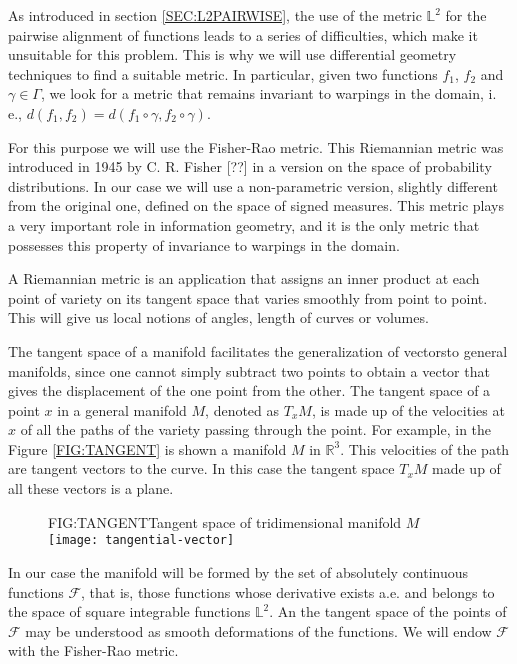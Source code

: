 As introduced in section \ref{SEC:L2PAIRWISE}, the use of the metric $\mathbb{L}^2$
for the pairwise alignment of functions leads to a series of difficulties, which make
it unsuitable for this problem. This is why we will use differential
geometry techniques to find a suitable metric. In particular, given two
functions $f_1$, $f_2$ and $\gamma \in \Gamma$, we look for a metric that
remains invariant to warpings in the domain, i. e.,
$d(f_1, f_2) = d(f_1 \circ \gamma, f_2 \circ \gamma)$.

For this purpose we will use the Fisher-Rao metric. This Riemannian metric was
introduced in 1945 by C. R. Fisher [??] in a version on the
space of probability distributions. In our case we will use a non-parametric
version, slightly different from the original one, defined on the space of
signed measures. This metric plays a very important role in information
geometry, and it is the only metric that possesses this property of
invariance to warpings in the domain\cite{Cencov1982}.

A Riemannian metric is an application that assigns an inner product at each
point of variety on its tangent space that varies smoothly from point to point.
This will give us local notions of angles, length of curves or volumes.

The tangent space of a manifold facilitates the generalization of
vectorsto general manifolds, since one
cannot simply subtract two points to obtain a vector that gives the displacement
of the one point from the other. The tangent space of a point $x$ in a general
manifold $M$, denoted as $T_xM$, is made up of the velocities at $x$ of all the
paths of the variety passing through the point. For example, in the Figure
\ref{FIG:TANGENT} is shown a manifold $M$ in $\mathbb{R}^3$. This velocities of
the path are tangent vectors to the curve. In this case the tangent space $T_xM$
made up of all these vectors is a plane.

\begin{figure}[Tangent space of tridimensional manifold]{FIG:TANGENT}{Tangent space of tridimensional manifold $M$}
  \texttt{[image: tangential-vector]}
\end{figure}

In our case the manifold will be formed by the set of absolutely continuous
functions $\mathcal{F}$, that is, those functions whose derivative exists a.e.
and belongs to the space of square integrable functions $\mathbb{L}^2$. An
the tangent space of the points of $\mathcal{F}$ may be understood as smooth
deformations of the functions.
We will endow $\mathcal{F}$ with the Fisher-Rao metric.


